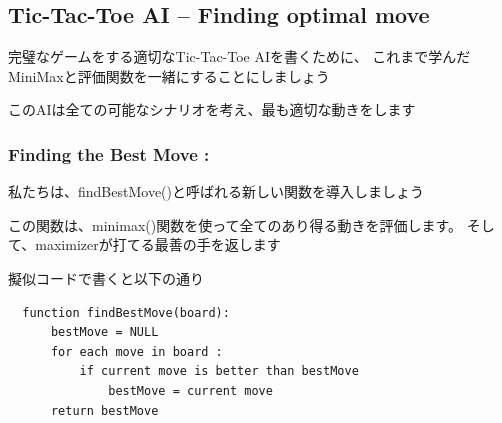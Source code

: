 \documentclass[uplatex,a4paper,11pt,oneside,openany]{jsbook}
\begin{document}

\subsection{Tic-Tac-Toe AI – Finding optimal move}

完璧なゲームをする適切なTic-Tac-Toe AIを書くために、
これまで学んだMiniMaxと評価関数を一緒にすることにしましょう

このAIは全ての可能なシナリオを考え、最も適切な動きをします

\subsubsection{Finding the Best Move :}

私たちは、findBestMove()と呼ばれる新しい関数を導入しましょう

この関数は、minimax()関数を使って全てのあり得る動きを評価します。
そして、maximizerが打てる最善の手を返します

擬似コードで書くと以下の通り

\begin{verbatim}
  function findBestMove(board):
      bestMove = NULL
      for each move in board :
          if current move is better than bestMove
              bestMove = current move
      return bestMove
\end{verbatim}
\end{document}
